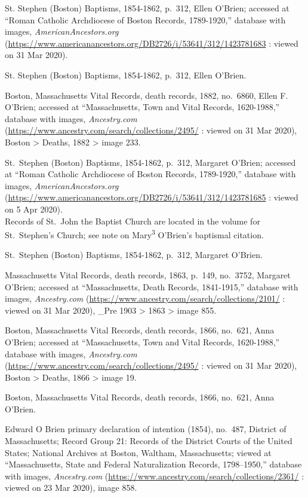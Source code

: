 \begin{thebibliography}{999}
St. Stephen (Boston) Baptisms, 1854-1862, p.\ 312, Ellen O'Brien; accessed at ``Roman Catholic Archdiocese of Boston Records, 1789-1920,'' database with images, \textit{AmericanAncestors.org} (\url{https://www.americanancestors.org/DB2726/i/53641/312/1423781683} : viewed on 31 Mar 2020).

St. Stephen (Boston) Baptisms, 1854-1862, p.\ 312, Ellen O'Brien.

Boston, Massachusetts Vital Records, death records, 1882, no.\ 6860, Ellen F. O'Brien; accessed at ``Massachusetts, Town and Vital Records, 1620-1988,'' database with images, \textit{Ancestry.com} (\url{https://www.ancestry.com/search/collections/2495/} : viewed on 31 Mar 2020), Boston > Deaths, 1882 > image 233.

St.\ Stephen (Boston) Baptisms, 1854-1862, p.\ 312, Margaret O'Brien; accessed at ``Roman Catholic Archdiocese of Boston Records, 1789-1920,'' database with images, \textit{AmericanAncestors.org} (\url{https://www.americanancestors.org/DB2726/i/53641/312/1423781685} : viewed on 5 Apr 2020).\\
Records of St.\ John the Baptist Church are located in the volume for St.\ Stephen's Church; see note on Mary\textsuperscript{3} O'Brien's baptismal citation.

St.\ Stephen (Boston) Baptisms, 1854-1862, p.\ 312, Margaret O'Brien.

Massachusetts Vital Records, death records, 1863, p.\ 149, no.\ 3752, Margaret O'Brien; accessed at ``Massachusetts, Death Records, 1841-1915,'' database with images, \textit{Ancestry.com} (\url{https://www.ancestry.com/search/collections/2101/} : viewed on 31 Mar 2020), \_Pre 1903 > 1863 > image 855.

Boston, Massachusetts Vital Records, death records, 1866, no.\ 621, Anna O'Brien; accessed at ``Massachusetts, Town and Vital Records, 1620-1988,'' database with images, \textit{Ancestry.com} (\url{https://www.ancestry.com/search/collections/2495/} : viewed on 31 Mar 2020), Boston > Deaths, 1866 > image 19.

Boston, Massachusetts Vital Records, death records, 1866, no.\ 621, Anna O'Brien.


Edward O Brien primary declaration of intention (1854), no.\ 487, 
District of Massachusetts; 
Record Group 21: Records of the District Courts of the United States; 
National Archives at Boston, Waltham, Massachusetts;
viewed at ``Massachusetts, State and Federal Naturalization Records, 1798--1950,''
database with images, \textit{Ancestry.com} (\url{https://www.ancestry.com/search/collections/2361/} : viewed on 23 Mar 2020), image 858.


\end{thebibliography}
